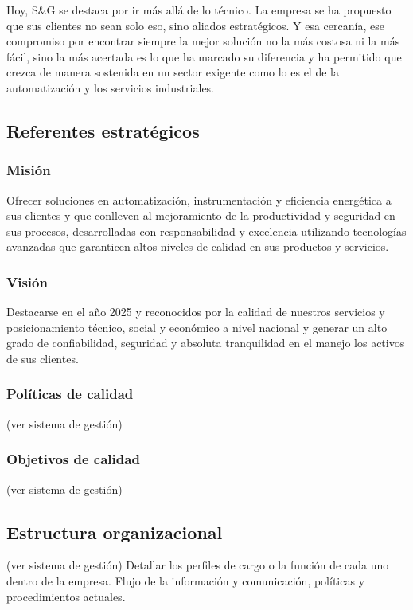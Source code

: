 Hoy, S\&G se destaca por ir más allá de lo técnico. La empresa se ha propuesto que sus clientes no sean solo eso, sino aliados estratégicos. Y esa cercanía, ese compromiso por encontrar siempre la mejor solución no la más costosa ni la más fácil, sino la más acertada es lo que ha marcado su diferencia y ha permitido que crezca de manera sostenida en un sector exigente como lo es el de la automatización y los servicios industriales.

\subsection{Referentes estratégicos}
\subsubsection{Misión}
Ofrecer soluciones en automatización, instrumentación y eficiencia energética a sus clientes y que conlleven al mejoramiento de la productividad y seguridad en sus procesos, desarrolladas con responsabilidad y excelencia utilizando tecnologías avanzadas que garanticen altos niveles de calidad en sus productos y servicios.

\subsubsection{Visión}
Destacarse en el año 2025 y reconocidos por la calidad de nuestros servicios y posicionamiento técnico, social y económico a nivel nacional y generar un alto grado de confiabilidad, seguridad y absoluta tranquilidad en el manejo los activos de sus clientes.

\subsubsection{Políticas de calidad}
(ver sistema de gestión)

\subsubsection{Objetivos de calidad} 
(ver sistema de gestión)

\subsection{Estructura organizacional} 
(ver sistema de gestión)
Detallar los perfiles de cargo o la función de cada uno dentro de la empresa.
Flujo de la información y comunicación, políticas y procedimientos actuales.


